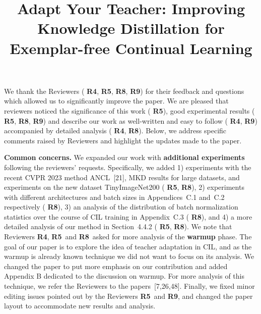 \documentclass[10pt,twocolumn,letterpaper]{article}
\newcommand{\Rfour}{{\bfseries\color{orange} R4}}
\newcommand{\Rfive}{{\bfseries\color{teal} R5}}
\newcommand{\Reight}{{\bfseries\color{magenta} R8}}
\newcommand{\Rnine}{{\bfseries\color{blue} R9}}
\begin{document}
\title{Adapt Your Teacher: Improving Knowledge Distillation for Exemplar-free Continual Learning}  %

\maketitle
\thispagestyle{empty}
\appendix

\noindent We thank the Reviewers (\Rfour, \Rfive, \Reight, \Rnine) for their feedback and questions which allowed us to significantly improve the paper. 
We are pleased that reviewers noticed the significance of this
work (\Rfive), good experimental results (\Rfive, \Reight, \Rnine) and describe our work as well-written and easy to follow (\Rfour, \Rnine) accompanied by detailed analysis (\Rfour, \Reight).
Below, we address specific comments raised by Reviewers and highlight the updates made to the paper. 

\noindent \textbf{Common concerns.} 
We expanded our work with \textbf{additional experiments} following the reviewers' requests. Specifically, we added 1) experiments with the recent CVPR 2023 method ANCL~[21], MKD results for large datasets, and experiments on the new dataset TinyImageNet200 (\Rfive, \Reight), 2) experiments with different architectures and batch sizes in Appendices~C.1 and~C.2 respectively (\Reight), 3) an analysis of the distribution of batch normalization statistics over the course of CIL training in Appendix~C.3 (\Reight), and 4) a more detailed analysis of our method in Section~4.4.2 (\Rfive, \Reight).
We note that Reviewers \Rfour, \Rfive\ and \Reight\ asked for more analysis of the \textbf{warmup} phase. The goal of our paper is to explore the idea of teacher adaptation in CIL, and as the warmup is already known technique we did not want to focus on its analysis. 
We changed the paper to put more emphasis on our contribution and added Appendix B dedicated to the discussion on warmup. For more analysis of this technique, we refer the Reviewers to the papers~[7,26,48].
Finally, we fixed minor editing issues pointed out by the Reviewers \Rfive ~and \Rnine, and changed the paper layout to accommodate new results and analysis. 
\end{document}
